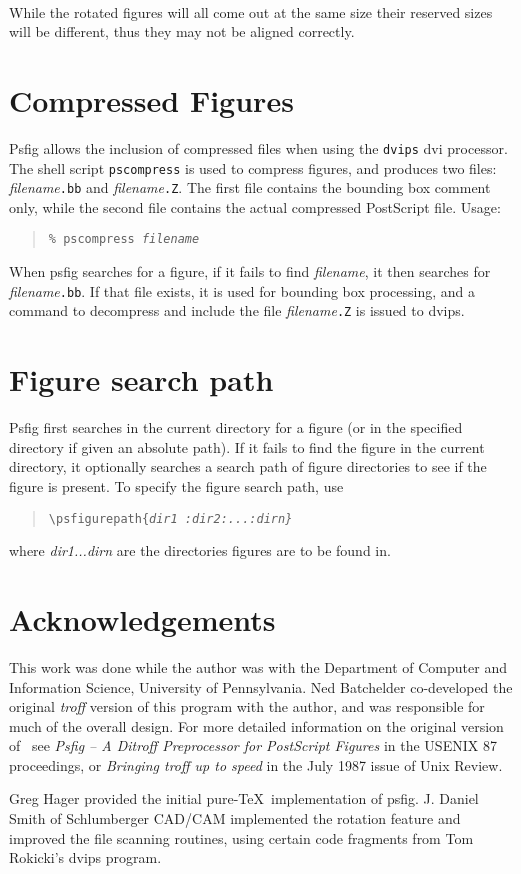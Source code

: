 \psscalefirst
\centerline{\hbox{
}} 

While the rotated figures will all come out at the same
size their reserved sizes will be different, thus
they may not be aligned correctly.

\section{Compressed Figures}
Psfig allows the inclusion of compressed \Ps files when using 
the {\tt dvips} dvi processor.
The shell script {\tt pscompress} is used to compress figures, and 
produces two files: {\it filename}{\tt .bb} and {\it filename}{\tt .Z}.
The first file contains the bounding box comment only, while the second
file contains the actual compressed PostScript file. Usage:
\begin{quote}
\tt \verb+%+ pscompress \it filename
\end{quote}
When psfig searches for a figure, if it fails to find 
{\it filename}, it then searches for {\it filename}{\tt .bb}.
If that file exists, it is used for bounding box processing,
and a command to  decompress and include the file {\it filename}{\tt .Z}
is issued to dvips.

\section{Figure search path}

Psfig first searches in the current directory for a figure (or
in the specified directory if given an absolute path). If it fails
to find the figure in the current directory, it optionally searches
a search path of figure directories to see if the figure is
present. To specify the figure search path, use
\begin{quote}
\tt \verb+\+psfigurepath\verb+{+\it dir1 \tt :\it dir2\tt :\it ...\tt :\it dirn\tt\verb+}+
\end{quote}
where {\it dir1...dirn} are the directories figures are to be found in.
\newpage
\section{Acknowledgements}
\par
This work was done while the author was with the Department of
Computer and Information Science, University of Pennsylvania.  Ned
Batchelder co-developed the original {\it troff} version of this
program with the author, and was responsible for much of the overall
design.  For more detailed information on the original version of \Ps\
see {\it Psfig -- A Ditroff Preprocessor for PostScript Figures} in
the USENIX 87 proceedings, or {\it Bringing troff up to speed} in the
July 1987 issue of Unix Review.

Greg Hager provided the initial pure-\TeX\ implementation of psfig.
J. Daniel Smith of Schlumberger CAD/CAM implemented the rotation
feature and improved the file scanning routines, using certain code
fragments from Tom Rokicki's dvips program.
\par 


